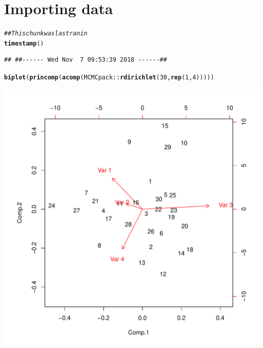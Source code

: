 \documentclass{article}\usepackage[]{graphicx}\usepackage[]{color}
\makeatletter
\def\maxwidth{ %
  \ifdim\Gin@nat@width>\linewidth
    \linewidth
  \else
    \Gin@nat@width
  \fi
}
\newcommand{\hlnum}[1]{\textcolor[rgb]{0.686,0.059,0.569}{#1}}%
\newcommand{\hlcom}[1]{\textcolor[rgb]{0.678,0.584,0.686}{\textit{#1}}}%
\newcommand{\hlopt}[1]{\textcolor[rgb]{0,0,0}{#1}}%
\newcommand{\hlstd}[1]{\textcolor[rgb]{0.345,0.345,0.345}{#1}}%
\newcommand{\hlkwd}[1]{\textcolor[rgb]{0.737,0.353,0.396}{\textbf{#1}}}%
\newenvironment{kframe}{%
 \def\at@end@of@kframe{}%
 \ifinner\ifhmode%
  \def\at@end@of@kframe{\end{minipage}}%
  \begin{minipage}{\columnwidth}%
 \fi\fi%
 \def\FrameCommand##1{\hskip\@totalleftmargin \hskip-\fboxsep
 \colorbox{shadecolor}{##1}\hskip-\fboxsep
     \hskip-\linewidth \hskip-\@totalleftmargin \hskip\columnwidth}%
 \MakeFramed {\advance\hsize-\width
   \@totalleftmargin\z@ \linewidth\hsize
   \@setminipage}}%
 {\par\unskip\endMakeFramed%
 \at@end@of@kframe}
\newenvironment{knitrout}{}{} %
\makeatother
\begin{document}
\section{Importing data}
\begin{knitrout}
\color{fgcolor}\begin{kframe}
\begin{alltt}
\hlcom{## This chunk was last ran in}
\hlkwd{timestamp}\hlstd{()}
\end{alltt}
\begin{verbatim}
## ##------ Wed Nov  7 09:53:39 2018 ------##
\end{verbatim}
\begin{alltt}
\hlkwd{biplot}\hlstd{(}\hlkwd{princomp}\hlstd{(}\hlkwd{acomp}\hlstd{(MCMCpack}\hlopt{::}\hlkwd{rdirichlet}\hlstd{(}\hlnum{30}\hlstd{,} \hlkwd{rep}\hlstd{(}\hlnum{1}\hlstd{,} \hlnum{4}\hlstd{)))))}
\end{alltt}
\end{kframe}
\includegraphics[width=\maxwidth]{figure/unnamed-chunk-6-1} 

\end{knitrout}
\end{document}
